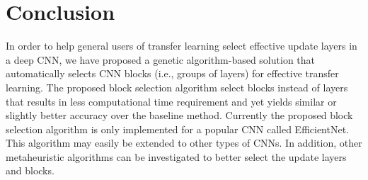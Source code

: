 \documentclass[a4paper,fleqn]{cas-sc}
\begin{document}
\section{Conclusion}
\label{sec:conclusion}
In order to help general users of transfer learning select effective update layers in a deep CNN, we have proposed a genetic algorithm-based solution that automatically selects CNN blocks (i.e., groups of layers) for effective transfer learning. The proposed block selection algorithm select blocks instead of layers that results in less computational time requirement and yet yields similar or slightly better accuracy over the baseline method. %
Currently the proposed  block selection algorithm is only implemented for a popular CNN called EfficientNet. This algorithm may easily be extended to other types of CNNs. In addition, other metaheuristic algorithms can be investigated to better select the update layers and blocks. %



%





\end{document}
